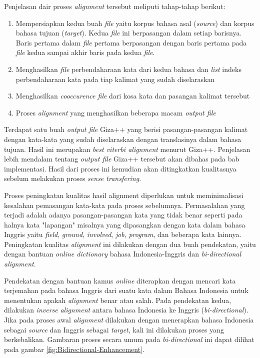 Penjelasan dair proses \textit{alignment} tersebut meliputi tahap-tahap berikut:
\begin{enumerate}
	\item Mempersiapkan kedua buah \textit{file} yaitu korpus bahasa asal (\textit{source}) dan korpus bahasa tujuan (\textit{target}). Kedua \textit{file} ini berpasangan dalam setiap barisnya. Baris pertama dalam \textit{file} pertama berpasangan dengan baris pertama pada \textit{file} kedua sampai akhir baris pada kedua \textit{file}.
	\item Menghasilkan \textit{file} perbendaharaan kata dari kedua bahasa dan \textit{list} indeks perbendaharaan kata pada tiap kalimat yang sudah diselaraskan
	\item Menghasilkan \textit{cooccurence file} dari kosa kata dan pasangan kalimat tersebut
	\item Proses \textit{alignment} yang menghasilkan beberapa macam \textit{output file} 
\end{enumerate}

Terdapat satu buah \textit{output file} Giza++ yang berisi pasangan-pasangan kalimat dengan kata-kata yang sudah diselaraskan dengan translasinya dalam bahasa tujuan. Hasil ini merupakan \textit{best viterbi alignment} menurut Giza++. Penjelasan lebih mendalam tentang \textit{output file} Giza++ tersebut akan dibahas pada bab implementasi. Hasil dari proses ini kemudian akan ditingkatkan kualitasnya sebelum melakukan proses \textit{sense transfering}.

Proses peningkatan kualitas hasil alignment diperlukan untuk meminimalisasi kesalahan pemasangan kata-kata pada proses sebelumnya. Permasalahan  yang terjadi adalah adanya pasangan-pasangan kata yang tidak benar seperti pada halnya kata "lapangan" misalnya yang  dipasangkan dengan kata dalam bahasa Inggris yaitu \textit{field}, \textit{ground}, \textit{involved}, \textit{job}, \textit{program}, dan beberapa kata lainnya. Peningkatan kualitas \textit{alignment} ini dilakukan dengan dua buah pendekatan, yaitu dengan bantuan \textit{online dictionary} bahasa Indonesia-Inggris dan \textit{bi-directional alignment}. 

Pendekatan dengan bantuan kamus \textit{online} diterapkan dengan mencari kata terjemahan pada bahasa Inggris dari suatu kata dalam Bahasa Indonesia untuk menentukan apakah \textit{alignment} benar atau salah. Pada pendekatan kedua, dilakukan \textit{inverse} \textit{alignment} antara bahasa Indonesia ke Inggris (\textit{bi-directional}). Jika pada proses awal \textit{alignment} dilakukan dengan menerapkan bahasa Indonesia sebagai \textit{source} dan Inggris sebagai \textit{target}, kali ini dilakukan proses yang berkebalikan. Gambaran proses secara umum pada \textit{bi-directional} ini dapat dilihat pada gambar \ref{fig:Bidirectional-Enhancement}.

